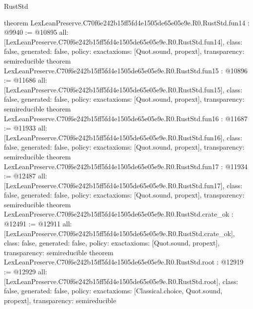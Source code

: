 \begin{lexlean}{RustStd}
\begin{coremodule}
{}
theorem LexLeanPreserve.C70f6e242b15ff5fd4e1505de65e05e9e.R0.RustStd.fun14 : @9940 := @10895 {
  all: [LexLeanPreserve.C70f6e242b15ff5fd4e1505de65e05e9e.R0.RustStd.fun14],
  class: false,
  generated: false,
  policy: exact{axioms: [Quot.sound, propext]},
  transparency: semireducible
}
theorem LexLeanPreserve.C70f6e242b15ff5fd4e1505de65e05e9e.R0.RustStd.fun15 : @10896 := @11686 {
  all: [LexLeanPreserve.C70f6e242b15ff5fd4e1505de65e05e9e.R0.RustStd.fun15],
  class: false,
  generated: false,
  policy: exact{axioms: [Quot.sound, propext]},
  transparency: semireducible
}
theorem LexLeanPreserve.C70f6e242b15ff5fd4e1505de65e05e9e.R0.RustStd.fun16 : @11687 := @11933 {
  all: [LexLeanPreserve.C70f6e242b15ff5fd4e1505de65e05e9e.R0.RustStd.fun16],
  class: false,
  generated: false,
  policy: exact{axioms: [Quot.sound, propext]},
  transparency: semireducible
}
theorem LexLeanPreserve.C70f6e242b15ff5fd4e1505de65e05e9e.R0.RustStd.fun17 : @11934 := @12487 {
  all: [LexLeanPreserve.C70f6e242b15ff5fd4e1505de65e05e9e.R0.RustStd.fun17],
  class: false,
  generated: false,
  policy: exact{axioms: [Quot.sound, propext]},
  transparency: semireducible
}
theorem LexLeanPreserve.C70f6e242b15ff5fd4e1505de65e05e9e.R0.RustStd.crate_ok : @12491 := @12911 {
  all: [LexLeanPreserve.C70f6e242b15ff5fd4e1505de65e05e9e.R0.RustStd.crate_ok],
  class: false,
  generated: false,
  policy: exact{axioms: [Quot.sound, propext]},
  transparency: semireducible
}
theorem LexLeanPreserve.C70f6e242b15ff5fd4e1505de65e05e9e.R0.RustStd.root : @12919 := @12929 {
  all: [LexLeanPreserve.C70f6e242b15ff5fd4e1505de65e05e9e.R0.RustStd.root],
  class: false,
  generated: false,
  policy: exact{axioms: [Classical.choice, Quot.sound, propext]},
  transparency: semireducible
}


\end{coremodule}
\end{lexlean}
